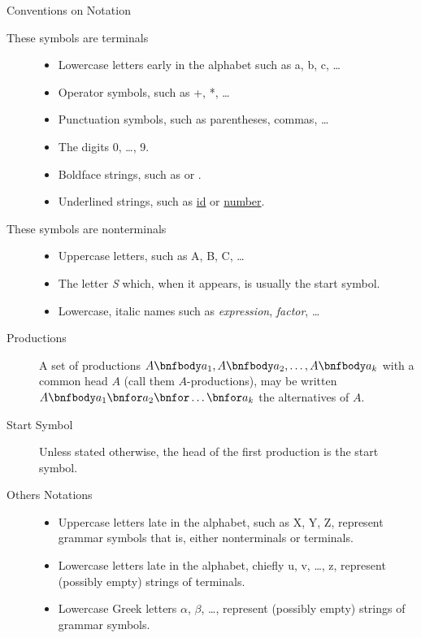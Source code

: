 \begin{bibunit}[apalike]
\begin{frame}[allowframebreaks]{Conventions on Notation}
	\begin{description}
	\item[These symbols are terminals]\begin{itemize}
		\item Lowercase letters early in the alphabet such as a, b, c, \dots
		\item Operator symbols, such as +, *, \dots
		\item Punctuation symbols, such as parentheses, commas, \dots
		\item The digits 0, \dots, 9.
		\item Boldface strings, such as  or .
		\item Underlined strings, such as \underline{id} or \underline{number}.
		\end{itemize}
	\item[These symbols are nonterminals]\begin{itemize}
		\item Uppercase letters, such as A, B, C, \dots
		\item The letter \textit{S} which, when it appears, is usually the start symbol.
		\item Lowercase, italic names such as \textit{expression}, \textit{factor}, \dots
		\end{itemize}
	\framebreak
	\item[Productions] A set of productions $A \bnfbody a_1, A \bnfbody a_2, \dots, A \bnfbody a_k$ with a common head $A$ (call them $A$-productions), may be written $A \bnfbody a_1 \bnfor a_2 \bnfor \dots \bnfor a_k$ the alternatives of $A$.
	\item[Start Symbol] Unless stated otherwise, the head of the first production is the start symbol.
	\item[Others Notations]\begin{itemize}
		\item Uppercase letters late in the alphabet, such as X, Y, Z, represent grammar symbols that is, either nonterminals or terminals.
		\item Lowercase letters late in the alphabet, chiefly u, v, \dots, z, represent (possibly empty) strings of terminals.
		\item Lowercase Greek letters $\alpha$, $\beta$, \dots, represent (possibly empty) strings of grammar symbols.
		\end{itemize}
	\end{description}
\end{frame}


\end{bibunit}
